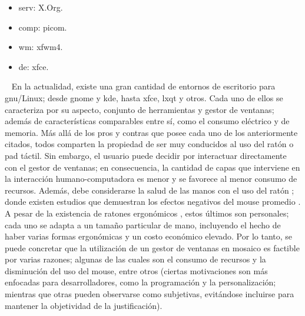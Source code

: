 \begin{itemize}
  \setlength\itemsep{1pt}
  \item \Gls{serv}: X.Org.
  \item \Gls{comp}: picom.
  \item \Gls{wm}: xfwm4.
  \item \Gls{de}: \acrshort{xfce}.
\end{itemize}
\ \newline
\normalsize{ \indent
En la actualidad, existe una gran cantidad de entornos
de escritorio para \acrshort{gnu}/Linux; desde
\acrshort{gnome} y \acrshort{kde}, hasta \acrshort{xfce},
\acrshort{lxqt} y otros. Cada uno de ellos se caracteriza
por su aspecto, conjunto de herramientas y gestor de
ventanas; además de características comparables entre sí,
como el consumo eléctrico y de memoria.
}
\newline
\normalsize{ \indent
Más allá de los pros y contras que posee cada uno de
los anteriormente citados, todos comparten la propiedad
de ser muy conducidos al uso del ratón o pad táctil. Sin
embargo, el usuario puede decidir por interactuar
directamente con el gestor de ventanas; en consecuencia,
la cantidad de capas que interviene en la interacción
humano-computadora es menor y se favorece al menor
consumo de recursos.
}
\newline
\normalsize{ \indent
Además, debe considerarse la salud de las manos con el
uso del ratón \cite{desorden_extremidades}; donde existen
estudios que demuestran los efectos negativos del mouse
promedio \cite{dermatosis}. A pesar de la existencia de
ratones ergonómicos \cite{hipotermia_munieca}, estos
últimos son personales; cada uno se adapta a un tamaño
particular de mano, incluyendo el hecho de haber varias
formas ergonómicas y un costo económico elevado.
}
\newline
\normalsize{ \indent
Por lo tanto, se puede concretar que la utilización
de un gestor de ventanas en mosaico es factible por
varias razones; algunas de las cuales son el consumo
de recursos y la disminución del uso del mouse, entre
otros (ciertas motivaciones son más enfocadas para
desarrolladores, como la programación y la
personalización; mientras que otras pueden observarse
como subjetivas, evitándose incluirse para mantener
la objetividad de la justificación).
}
